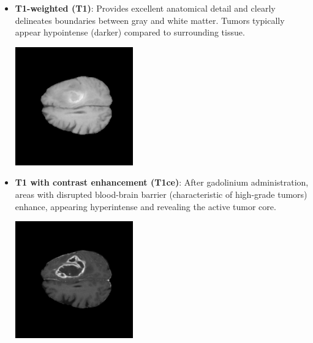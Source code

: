 \begin{itemize}
  \item \textbf{T1-weighted (T1)}: Provides excellent anatomical detail and clearly delineates boundaries between gray and white matter. Tumors typically appear hypointense (darker) compared to surrounding tissue.

        \begin{minipage}{\linewidth}
          \centering
          \includegraphics[width=0.4\textwidth]{./Images/Chapter2/t1.png}
          \captionsetup{hypcap=false}
          \label{fig:t1}
        \end{minipage}
        \vspace{\baselineskip}

  \item \textbf{T1 with contrast enhancement (T1ce)}: After gadolinium administration, areas with disrupted blood-brain barrier (characteristic of high-grade tumors) enhance, appearing hyperintense and revealing the active tumor core.

        \begin{minipage}{\linewidth}
          \centering
          \includegraphics[width=0.4\textwidth]{./Images/Chapter2/t1ce.png}
          \captionsetup{hypcap=false}
          \label{fig:t1ce}
        \end{minipage}
        \vspace{\baselineskip}


\end{itemize}
